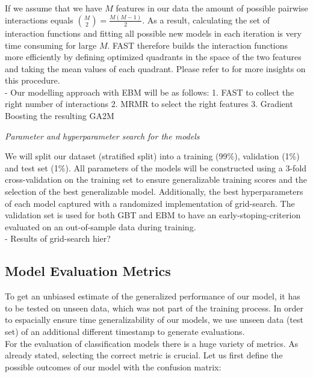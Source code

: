 \documentclass[12pt,titlepage]{article}
\begin{document}
If we assume that we have $M$ features in our data the amount of possible pairwise interactions equals $\binom{M}{2} = \frac{M(M-1)}{2}$. As a result, calculating the set of interaction functions and fitting all possible new models in each iteration is very time consuming for large $M$. FAST therefore builds the interaction functions more efficiently by defining optimized quadrants in the space of the two features and taking the mean values of each quadrant. Please refer to \cite{ga2m} for more insights on this procedure. \\
- Our modelling approach with EBM will be as follows: 1. FAST to collect the right number of interactions 2. MRMR to select the right features 3. Gradient Boosting the resulting GA2M

\textit{Parameter and hyperparameter search for the models}

We will split our dataset (stratified split) into a training (99$\%$), validation (1$\%$) and test set (1$\%$). All parameters of the models will be constructed using a 3-fold cross-validation on the training set to ensure generalizable training scores and the selection of the best generalizable model. Additionally, the best hyperparameters of each model captured with a randomized implementation of grid-search. The validation set is used for both GBT and EBM to have an early-stoping-criterion evaluated on an out-of-sample data during training.\\
- Results of grid-search hier? \\

\subsection{Model Evaluation Metrics} \par

To get an unbiased estimate of the generalized performance of our model, it has to be tested on unseen data, which was not part of the training process. In order to espacially ensure time generalizability of our models, we use unseen data (test set) of an additional different timestamp to generate evaluations. \\
For the evaluation of classification models there is a huge variety of metrics. As already stated, selecting the correct metric is crucial. Let us first define the possible outcomes of our model with the confusion matrix: \\

\renewcommand{\arraystretch}{2}
\end{document}
